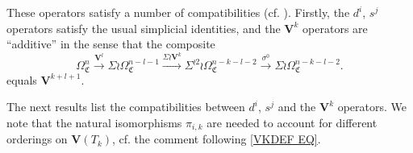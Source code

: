 \documentclass[a4paper,10pt
,draft
]{article}%
\numberwithin{equation}{section}
\numberwithin{figure}{section}
\theoremstyle{definition} %
\newcommand{\1}{\ensuremath{\mathbbm 1}}%
\begin{document}
These operators satisfy a number of compatibilities (cf. \cite[Prop. 3.90]{BP_geo}). Firstly, the $d^i$, $s^j$ operators satisfy the usual simplicial identities, 
and the $\boldsymbol{V}^k$ operators are ``additive'' in the sense that
the composite
\begin{equation}\label{VKADD EQ}
	\Omega^{n}_{\mathfrak{C}} \xrightarrow{\boldsymbol{V}^l} 
	\Sigma \wr \Omega^{n-l-1}_{\mathfrak{C}} \xrightarrow{\Sigma \wr \boldsymbol{V}^k}
	\Sigma^{\wr 2} \wr \Omega^{n-k-l-2}_{\mathfrak{C}} \xrightarrow{\sigma^0}
	\Sigma \wr \Omega^{n-k-l-2}_{\mathfrak{C}}.
\end{equation}
equals $\boldsymbol{V}^{k+l+1}$.

The next results list the compatibilities between $d^i$, $s^j$ and the $\boldsymbol{V}^k$ operators.
We note that the natural isomorphisms $\pi_{i,k}$
are needed to account for different orderings on 
$\boldsymbol{V}(T_k)$,
cf. the comment following \eqref{VKDEF EQ}.
\end{document}
